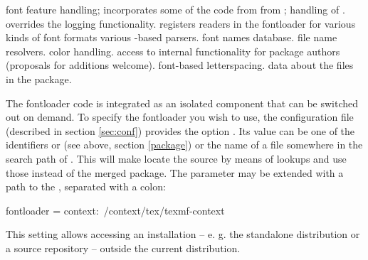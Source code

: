 \beginfilelist
      font feature handling; incorporates some of the code from
       from \CONTEXT;
    \endaltitem
      handling of .
    \endaltitem
      overrides the \CONTEXT logging functionality.
    \endaltitem
      registers readers in the fontloader for various kinds of
      font formats
    \endaltitem
      various -based parsers.
    \endaltitem
      font names database.
    \endaltitem
      file name resolvers.
    \endaltitem
      color handling.
    \endaltitem
      access to internal functionality for package authors (proposals
      for additions welcome).
    \endaltitem
      font-based letterspacing.
    \endaltitem
      data about the files in the package.
    \endaltitem
\endfilelist


\endsubsection


\label{sec:pkg}%
The fontloader code is integrated as an isolated component that can be
switched out on demand.
%
To specify the fontloader you wish to use, the configuration file
(described in section \ref{sec:conf}) provides the option
.
%
Its value can be one of the identifiers  or
 (see above, section \ref{package}) or the name
of a file somewhere in the search path of \LUATEX.
%
This will make  locate the \CONTEXT source by
means of  lookups and use those instead of the
merged package.
%
The parameter may be extended with a path to the \CONTEXT
{}, separated with a colon:

\beginlisting
[run]
  fontloader = context:~/context/tex/texmf-context
\endlisting

\noindent This setting allows accessing an installation -- e. g. the
standalone distribution or a source repository -- outside the current
\TEX distribution.

